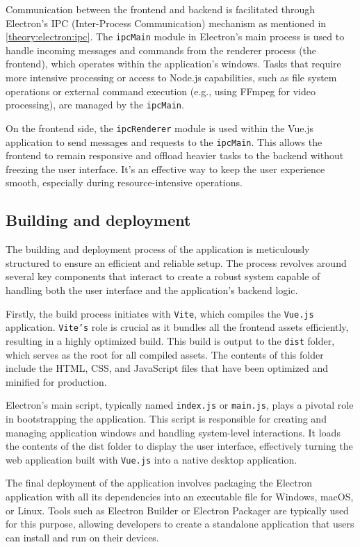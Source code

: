 Communication between the frontend and backend is facilitated through Electron's IPC (Inter-Process Communication) mechanism as mentioned in \ref{theory:electron:ipc}. The \texttt{ipcMain} module in Electron's main process is used to handle incoming messages and commands from the renderer process (the frontend), which operates within the application's windows. Tasks that require more intensive processing or access to Node.js capabilities, such as file system operations or external command execution (e.g., using FFmpeg for video processing), are managed by the \texttt{ipcMain}.

On the frontend side, the \texttt{ipcRenderer} module is used within the Vue.js application to send messages and requests to the \texttt{ipcMain}. This allows the frontend to remain responsive and offload heavier tasks to the backend without freezing the user interface. It's an effective way to keep the user experience smooth, especially during resource-intensive operations.

\subsection{Building and deployment}

The building and deployment process of the application is meticulously structured to ensure an efficient and reliable setup. The process revolves around several key components that interact to create a robust system capable of handling both the user interface and the application's backend logic.

Firstly, the build process initiates with \texttt{Vite}, which compiles the \texttt{Vue.js} application. \texttt{Vite's} role is crucial as it bundles all the frontend assets efficiently, resulting in a highly optimized build. This build is output to the \texttt{dist} folder, which serves as the root for all compiled assets. The contents of this folder include the HTML, CSS, and JavaScript files that have been optimized and minified for production.

Electron's main script, typically named \texttt{index.js} or \texttt{main.js}, plays a pivotal role in bootstrapping the application. This script is responsible for creating and managing application windows and handling system-level interactions. It loads the contents of the dist folder to display the user interface, effectively turning the web application built with \texttt{Vue.js} into a native desktop application.

The final deployment of the application involves packaging the Electron application with all its dependencies into an executable file for Windows, macOS, or Linux. Tools such as Electron Builder or Electron Packager are typically used for this purpose, allowing developers to create a standalone application that users can install and run on their devices.

